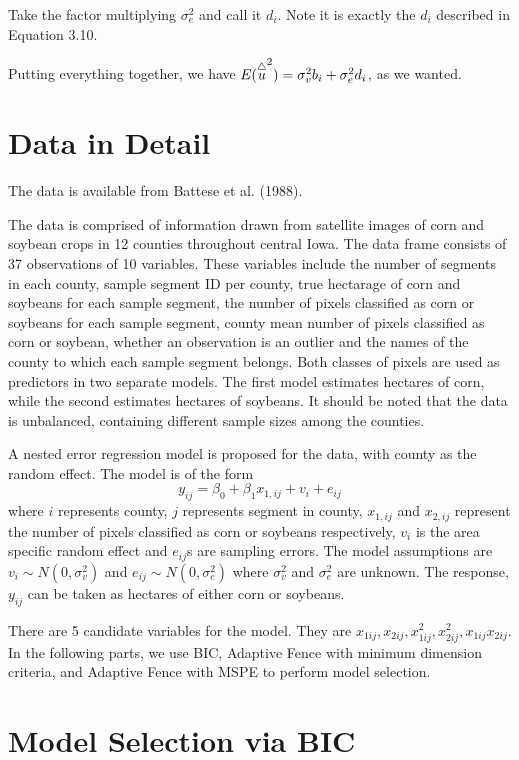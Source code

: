 \documentclass[11pt,letter]{article}
\begin{document}
Take the factor multiplying $\sigma^2_e$ and call it $d_i$. Note it is exactly the $d_i$ described in Equation 3.10.

Putting everything together, we have $E(\overset{\triangle}{u}^2)=\sigma^2_vb_i+\sigma^2_ed_i$, as we wanted.

\section{Data in Detail}

The data is available from Battese et al. (1988).

The data is comprised of information drawn from satellite images of corn and soybean crops in 12 counties throughout central Iowa.  The data frame consists of 37 observations of 10 variables.  These variables include the number of segments in each county, sample segment ID per county, true hectarage of corn and soybeans for each sample segment, the number of pixels classified as corn or soybeans for each sample segment, county mean number of pixels classified as corn or soybean, whether an observation is an outlier and the names of the county to which each sample segment belongs.  Both classes of pixels are used as predictors in two separate models.  The first model estimates hectares of corn, while the second estimates hectares of soybeans.  It should be noted that  the data is unbalanced, containing different sample sizes among the counties.

A nested error regression model is proposed for the data, with county as the random effect.  The model is of the form 
$$y_{ij}=\beta_0+\beta_1x_{1,ij}+v_i+e_{ij}$$
where $i$ represents county, $j$ represents segment in county, $x_{1,ij}$ and $x_{2,ij}$ represent the number of pixels classified as corn or soybeans respectively, $v_i$ is the area specific random effect and $e_{ij}$s  are sampling errors.  The model assumptions are $v_i\sim N(0,\sigma_v^2)$ and $e_{ij}\sim N(0,\sigma^2_e)$ where $\sigma_v^2$ and $\sigma_e^2$ are unknown.  The response, $y_{ij}$ can be taken as hectares of either corn or soybeans.

There are 5 candidate variables  for the model. They are $x_{1ij}, x_{2ij} , x_{1ij}^2 , x_{2ij}^2 , x_{1ij}x_{2ij}.$  
In the following parts, we use BIC, Adaptive Fence with minimum dimension criteria, and Adaptive Fence with MSPE to perform model selection.  

\section{Model Selection via BIC}
\end{document}

